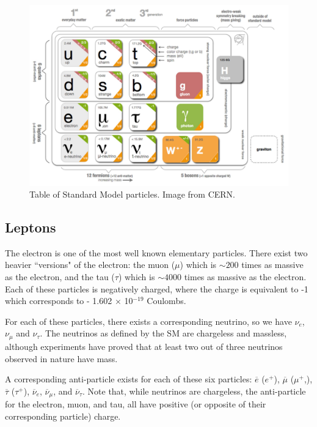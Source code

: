 \begin{figure}[h]
    \centering
        \includegraphics[width=\textwidth]{F1/StandardModelTable}
        \caption{Table of Standard Model particles. Image from CERN\cite{SMTable}.}
        \label{Fig:Intro:SMTable}
\end{figure}

\clearpage
\subsection{Leptons}
The electron is one of the most well known elementary particles. There exist two heavier ``versions" of the electron: the muon ($\mu$) which is $\sim 200$ times as massive as the electron, and the tau ($\tau$) which is $\sim 4000$ times as massive as the electron. Each of these particles is negatively charged, where the charge is equivalent to -1 which corresponds to - 1.602 $\times$ 10$^{-19}$ Coulombs.

For each of these particles, there exists a corresponding neutrino, so we have $\nu_e$, $\nu_\mu$ and $\nu_\tau$. The neutrinos as defined by the SM are chargeless and massless, although experiments have proved that at least two out of three neutrinos observed in nature have mass. 

A corresponding anti-particle exists for each of these six particles: $\overline{e}$ ($e^+$), $\overline{\mu}$ ($\mu^+$,), $\overline{\tau}$ ($\tau^+$), $\overline{\nu}_e$, $\overline{\nu}_\mu$, and $\overline{\nu}_\tau$. Note that, while neutrinos are chargeless, the anti-particle for the electron, muon, and tau, all have positive (or opposite of their corresponding particle) charge.

